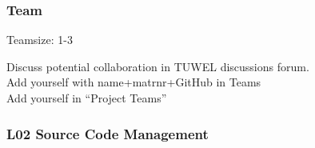 \begin{assignment}
	\frametitle{Team}
	Teamsize: 1-3

	\begin{task}
	Discuss potential collaboration in TUWEL discussions forum. \\
	Add yourself with name+matrnr+GitHub in Teams \\
	Add yourself in ``Project Teams''
	\end{task}
\end{assignment}

\begin{frame}
	\frametitle{L02 Source Code Management}
\end{frame}



\nocite{raab2017introducing}

\appendix

\begin{frame}[allowframebreaks]
	
	
\end{frame}




